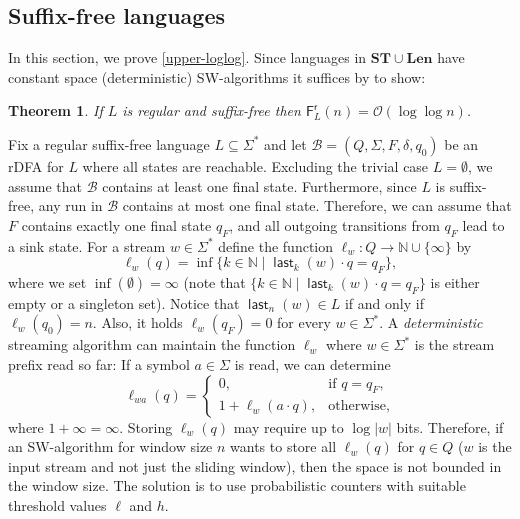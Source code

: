 \documentclass{article}\usepackage[a4paper,margin=20mm]{geometry}
\newtheorem{theorem}{Theorem}\newtheorem{lemma}[theorem]{Lemma}\newtheorem{proposition}[theorem]{Proposition}\newtheorem{corollary}[theorem]{Corollary}\newtheorem{definition}[theorem]{Definition}\newtheorem{claim}[theorem]{Claim}\newtheorem{remark}[theorem]{Remark}\newtheorem{observation}[theorem]{Observation}\newtheorem{conjecture}[theorem]{Conjecture}\newtheorem{example}[theorem]{Example}
\newcommand{\N}{\mathbb{N}}
\newcommand{\B}{\mathcal{B}}
\renewcommand{\O}{\mathcal{O}}
\newcommand{\F}{\mathsf{F}}
\renewcommand{\r}{\mathsf{r}}
\DeclareMathOperator{\last}{\mathsf{last}}
\newcommand{\Len}{\mathbf{Len}}
\newcommand{\ST}{\mathbf{ST}}
\begin{document}
\subsection{Suffix-free languages} \label{sec-random-suffix-free}

In this section, we prove \ref{upper-loglog}.
Since languages in $\ST \cup \Len$ have constant space (deterministic) SW-algorithms
it suffices by   to show:
\begin{theorem}
	\label{thm:sf-loglog}
	If $L$ is regular and suffix-free then $\F^\r_L(n) = \O(\log \log n)$.
\end{theorem}

Fix a regular suffix-free language $L \subseteq \Sigma^*$ and
let $\B = (Q,\Sigma,F,\delta,q_0)$ be an rDFA for $L$ where all states are reachable.
Excluding the trivial case $L = \emptyset$, we assume that $\B$ contains at least one final state.
Furthermore, since $L$ is suffix-free, any run in $\B$ contains at most one final state.
Therefore, we can assume that $F$ contains exactly one final state $q_F$, and all outgoing transitions
from $q_F$ lead to a sink state.
For a stream $w \in \Sigma^*$ define the function $\ell_w \colon Q \to \N \cup \{ \infty \}$ by
\begin{equation}
 \ell_w(q) = \inf \{  k \in \N \mid \last_k(w) \cdot q = q_F \}, \label{def-l_q(w)}
\end{equation}
where we set $\inf(\emptyset) = \infty$ (note that $\{  k \in \N \mid \last_k(w) \cdot q = q_F \}$ is either empty or a singleton set).
Notice that $\last_n(w) \in L$ if and only if $\ell_{w}(q_0) = n$. Also, it holds $\ell_w(q_F) = 0$ for every $w \in \Sigma^*$.
A {\em deterministic} streaming algorithm can maintain the function $\ell_w$ where $w \in \Sigma^*$ is
the stream prefix read so far:
If a symbol $a \in \Sigma$ is read, we can determine
\begin{equation}
	\label{eq:maintain-ellw}
	\ell_{wa}(q) = \begin{cases}
	0, & \text{if } q = q_F, \\
	1 + \ell_w(a \cdot q), & \text{otherwise,}
	\end{cases}
\end{equation}
where $1 + \infty = \infty$.
Storing $\ell_w(q)$ may require up to $\log |w|$ bits. Therefore, if an SW-algorithm for window size $n$
wants to store all $\ell_w(q)$ for $q \in Q$ ($w$ is the input stream and not just the sliding window), then the space is not bounded in the window size. 
The solution is to use probabilistic counters with suitable threshold values $\ell$ and $h$.
\end{document}
